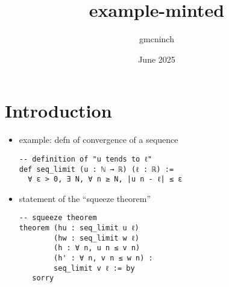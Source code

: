 \documentclass{article}
\title{example-minted}
\author{gmcninch }
\date{June 2025}
\begin{document}
\maketitle

\section{Introduction}

 \begin{itemize}
\item example: defn of convergence of a sequence

\begin{verbatim}
-- definition of "u tends to ℓ" 
def seq_limit (u : ℕ → ℝ) (ℓ : ℝ) :=
  ∀ ε > 0, ∃ N, ∀ n ≥ N, |u n - ℓ| ≤ ε
\end{verbatim}

\item statement of the ``squeeze theorem''  
\begin{verbatim}
-- squeeze theorem
theorem (hu : seq_limit u ℓ)
        (hw : seq_limit w ℓ)
        (h : ∀ n, u n ≤ v n)
        (h' : ∀ n, v n ≤ w n) :
        seq_limit v ℓ := by
   sorry
\end{verbatim}
\end{itemize}
\end{document}
